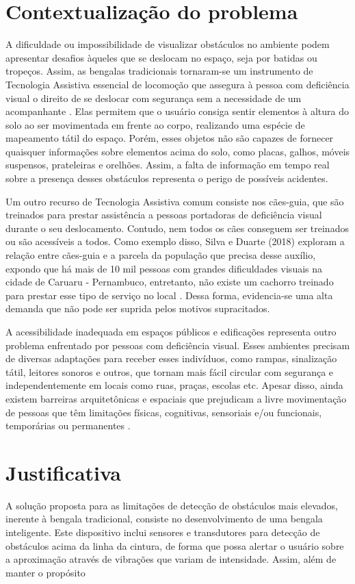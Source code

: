 \section{Contextualização do problema}
A dificuldade ou impossibilidade de visualizar obstáculos no ambiente podem apresentar desafios àqueles que se deslocam no espaço, seja por batidas ou tropeços. Assim, as bengalas tradicionais tornaram-se um instrumento de Tecnologia Assistiva essencial de locomoção que assegura à pessoa com deficiência visual o direito de se deslocar com segurança sem a necessidade de um acompanhante \cite{bengala-branca}. Elas permitem que o usuário consiga sentir elementos à altura do solo ao ser movimentada em frente ao corpo, realizando uma espécie de mapeamento tátil do espaço. Porém, esses objetos não são capazes de fornecer quaisquer informações sobre elementos acima do solo, como placas, galhos, móveis suspensos, prateleiras e orelhões. Assim, a falta de informação em tempo real sobre a presença desses obstáculos representa o perigo de possíveis acidentes.

Um outro recurso de Tecnologia Assistiva comum consiste nos cães-guia, que são treinados para prestar assistência a pessoas portadoras de deficiência visual durante o seu deslocamento. Contudo, nem todos os cães conseguem ser treinados ou são acessíveis a todos. Como exemplo disso, Silva e Duarte (2018) exploram a relação entre cães-guia e a parcela da população que precisa desse auxílio, expondo que há mais de 10 mil pessoas com grandes dificuldades visuais na cidade de Caruaru - Pernambuco, entretanto, não existe um cachorro treinado para prestar esse tipo de serviço no local \cite{cao-guia-ta}. Dessa forma, evidencia-se uma alta demanda que não pode ser suprida pelos motivos supracitados.

A acessibilidade inadequada em espaços públicos e edificações representa outro problema enfrentado por pessoas com deficiência visual. Esses ambientes precisam de diversas adaptações para receber esses indivíduos, como rampas, sinalização tátil, leitores sonoros e outros, que tornam mais fácil circular com segurança e independentemente em locais como ruas, praças, escolas etc. Apesar disso, ainda existem barreiras arquitetônicas e espaciais que prejudicam a livre movimentação de pessoas que têm limitações físicas, cognitivas, sensoriais e/ou funcionais, temporárias ou permanentes \cite{BarreirasArquitetonicas}.


\section{Justificativa}
A solução proposta para as limitações de detecção de obstáculos mais elevados, inerente à bengala tradicional, consiste no desenvolvimento de uma bengala inteligente. Este dispositivo inclui sensores e transdutores para detecção de obstáculos acima da linha da cintura, de forma que possa alertar o usuário sobre a aproximação através de vibrações que variam de intensidade. Assim, além de manter o propósito

